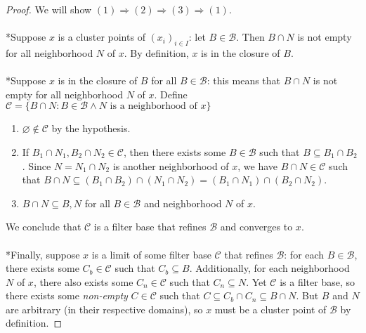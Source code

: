 \documentclass{treatise}
\begin{document}
\begin{proof}
We will show $(1) \Rightarrow (2) \Rightarrow (3) \Rightarrow (1)$.
\\
\\
*Suppose $x$ is a cluster points of $(x_i)_{i \in I}$: let $B \in \mathcal{B}$. Then $B \cap N$ is not empty for all neighborhood $N$ of $x$. By definition, $x$ is in the closure of $B$.
\\
\\
*Suppose $x$ is in the closure of $B$ for all $B \in \mathcal{B}$: this means that $B \cap N$ is not empty for all neighborhood $N$ of $x$. Define $\mathcal{C} = \{ B \cap N : B \in \mathcal{B} \wedge N \mbox{ is a neighborhood of } x \}$
\begin{enumerate}
    \item $\varnothing \notin \mathcal{C}$ by the hypothesis.
    \item If $B_1 \cap N_1, B_2 \cap N_2 \in \mathcal{C}$, then there exists some $B \in \mathcal{B}$ such that $B \subseteq B_1 \cap B_2$. Since $N = N_1 \cap N_2$ is another neighborhood of $x$, we have $B \cap N \in \mathcal{C}$ such that $B \cap N \subseteq (B_1 \cap B_2) \cap (N_1 \cap N_2) = (B_1 \cap N_1) \cap (B_2 \cap N_2)$.
    \item $B \cap N \subseteq B, N$ for all $B \in \mathcal{B}$ and neighborhood $N$ of $x$.
\end{enumerate}
We conclude that $\mathcal{C}$ is a filter base that refines $\mathcal{B}$ and converges to $x$.
\\
\\
*Finally, suppose $x$ is a limit of some filter base $\mathcal{C}$ that refines $\mathcal{B}$: for each $B \in \mathcal{B}$, there exists some $C_b \in \mathcal{C}$ such that $C_b \subseteq B$. Additionally, for each neighborhood $N$ of $x$, there also exists some $C_n \in \mathcal{C}$ such that $C_n \subseteq N$. Yet $\mathcal{C}$ is a filter base, so there exists some \textit{non-empty} $C \in \mathcal{C}$ such that $C \subseteq C_b \cap C_n \subseteq B \cap N$. But $B$ and $N$ are arbitrary (in their respective domains), so $x$ must be a cluster point of $\mathcal{B}$ by definition.
\end{proof}
\end{document}
